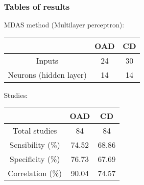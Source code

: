 \documentclass{beamer}
\begin{document}
\begin{frame}
\frametitle {Tables of results}
MDAS method (Multilayer perceptron):
\begin{center}
\begin{tabular}{c c c}
\hline
  & OAD & CD \\
\hline
Inputs & 24 & 30\\
Neurons (hidden layer) & 14 & 14\\
\hline
\end{tabular}
\end{center}
\pause
Studies:
\begin{center}
\begin{tabular}{c c c}
\hline
  & OAD & CD \\
\hline
Total studies & 84 & 84\\
Sensibility (\%) & 74.52 & 68.86\\
Specificity (\%) & 76.73 & 67.69\\
Correlation (\%) & 90.04 & 74.57\\
\hline
\end{tabular}
\end{center}
\end{frame}
\end{document}
